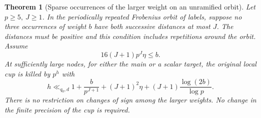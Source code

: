 \documentclass[a4paper,11pt]{article}
\newtheorem{theorem}[proposition]{Theorem}
\theoremstyle{definition}
\theoremstyle{remark}
\numberwithin{equation}{section}
\begin{document}
\begin{theorem}[Sparse occurrences of the larger weight on an unramified orbit]
\leavevmode\label{thm:sparsecups780}
Let \(p\ge5,\ J\ge1\). In the periodically repeated
Frobenius orbit of labels, suppose no three occurrences
of weight \(b\) have both successive distances at most
\(J\). The distances must be positive and this condition
includes repetitions around the orbit. Assume
\[
               16(J+1)p^J\eta\le b .
\]
At sufficiently large nodes, for either the main or a
scalar target, the original local cup is killed by \(p^h\)
with
\[
 h\ll_{q_0,d}
  1+\frac{b}{p^{J+1}}+(J+1)^2\eta
                  +(J+1)\frac{\log(2b)}{\log p}.
\]
There is no restriction on changes of sign among the
larger weights. No change in the finite precision of the
cup is required.
\end{theorem}
\end{document}

